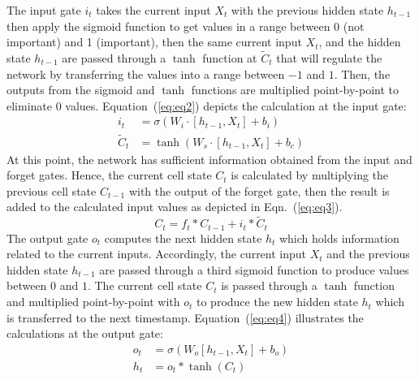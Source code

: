 The input gate \(i_{t}\) takes the current input \(X_t\) with the previous hidden state \(h_{t-1}\) then apply the sigmoid function to get values in a range between 0 (not important) and 1 (important), then the
same current input \(X_t\), and the hidden state \(h_{t-1}\) are passed through a \(\tanh\) function at \(\tilde{C}_{t}\) that will regulate the network by transferring the values into a range between \(-1\) and \(1\).
Then, the outputs from the sigmoid and \(\tanh\) functions are multiplied point-by-point to eliminate \(0\) values.  
Equation~(\ref{eq:eq2}) depicts the calculation at the input gate:
\begin{equation}
	\begin{aligned}
		i_{t} &=\sigma\left(W_{i} \cdot\left[h_{t-1}, X_{t}\right]+b_{i}\right) 
		\\
		\tilde{C}_{t} &=\tanh \left(W_{s} \cdot\left[h_{t-1}, X_{t}\right]+b_{c}\right) 
	\end{aligned} \label{eq:eq2}
\end{equation}
At this point, the network has sufficient information obtained from the input and forget gates. 
Hence, the current cell state \(C_t\) is calculated by multiplying the previous cell state \(C_{t-1}\) with the output of the forget gate, then the result is added to the calculated input values as depicted in Eqn.~(\ref{eq:eq3}).
\begin{equation}
	C_{t}=f_{t} * C_{t-1}+i_{t} * \tilde{C}_{t}
	\label{eq:eq3}
\end{equation}
The output gate \(o_{t}\) computes the next hidden state \(h_{t}\) which
holds information related to the current inputs. 
Accordingly, the current input \(X_{t}\) and the previous hidden state \(h_{t-1}\) are passed through a third sigmoid function to produce values between \(0\) and \(1\).
The current cell state \(C_{t}\) is passed through a \(\tanh\) function and multiplied point-by-point with \(o_{t}\) to produce the new hidden state \(h_{t}\) which is transferred to the next timestamp.
Equation~(\ref{eq:eq4}) illustrates the calculations at the output gate:
\begin{equation}
	\begin{aligned}
		o_{t} &=\sigma\left(W_{o}\left[h_{t-1}, X_{t}\right]+b_{o}\right) \\
		h_{t} &=o_{t} * \tanh \left(C_{t}\right)
	\end{aligned}
	\label{eq:eq4}
\end{equation} 

